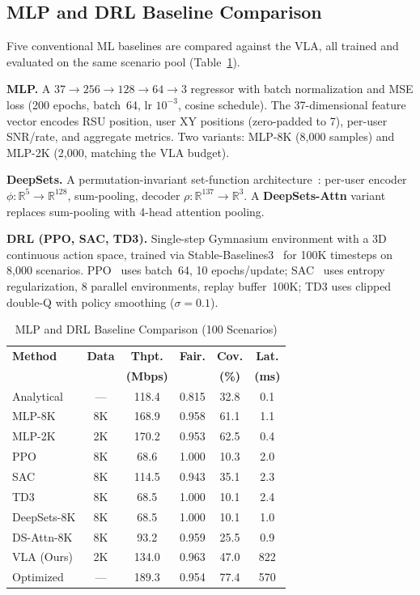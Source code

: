 \documentclass[journal]{IEEEtran}
\begin{document}
\subsection{MLP and DRL Baseline Comparison}
\label{sec:mlp_drl}

Five conventional ML baselines are compared against the VLA, all trained and evaluated on the same scenario pool (Table~\ref{tab:mlp_drl}).

\textbf{MLP.} A $37 \to 256 \to 128 \to 64 \to 3$ regressor with batch normalization and MSE loss (200 epochs, batch~64, lr $10^{-3}$, cosine schedule). The 37-dimensional feature vector encodes RSU position, user XY positions (zero-padded to 7), per-user SNR/rate, and aggregate metrics. Two variants: MLP-8K (8{,}000 samples) and MLP-2K (2{,}000, matching the VLA budget).

\textbf{DeepSets.} A permutation-invariant set-function architecture~\cite{zaheer2017deepsets}: per-user encoder $\phi: \mathbb{R}^5 \to \mathbb{R}^{128}$, sum-pooling, decoder $\rho: \mathbb{R}^{137} \to \mathbb{R}^3$. A \textbf{DeepSets-Attn} variant replaces sum-pooling with 4-head attention pooling.

\textbf{DRL (PPO, SAC, TD3).} Single-step Gymnasium environment with a 3D continuous action space, trained via Stable-Baselines3~\cite{raffin2021sb3} for 100K timesteps on 8{,}000 scenarios. PPO~\cite{schulman2017ppo} uses batch~64, 10 epochs/update; SAC~\cite{haarnoja2018sac} uses entropy regularization, 8 parallel environments, replay buffer~100K; TD3 uses clipped double-Q with policy smoothing ($\sigma{=}0.1$).

\begin{table}[!t]
    \centering
    \caption{MLP and DRL Baseline Comparison (100 Scenarios)}
    \label{tab:mlp_drl}
    \small
    \begin{tabular}{l@{\hskip 5pt}c@{\hskip 5pt}c@{\hskip 5pt}c@{\hskip 5pt}c@{\hskip 5pt}c}
        \toprule
        \textbf{Method} & \textbf{Data} & \textbf{Thpt.} & \textbf{Fair.} & \textbf{Cov.} & \textbf{Lat.} \\
        & & \textbf{(Mbps)} & & \textbf{(\%)} & \textbf{(ms)} \\
        \midrule
        Analytical & --- & 118.4 & 0.815 & 32.8 & 0.1 \\
        MLP-8K & 8K & 168.9 & 0.958 & 61.1 & 1.1 \\
        MLP-2K & 2K & 170.2 & 0.953 & 62.5 & 0.4 \\
        PPO & 8K & 68.6 & 1.000 & 10.3 & 2.0 \\
        SAC & 8K & 114.5 & 0.943 & 35.1 & 2.3 \\
        TD3 & 8K & 68.5 & 1.000 & 10.1 & 2.4 \\
        DeepSets-8K & 8K & 68.5 & 1.000 & 10.1 & 1.0 \\
        DS-Attn-8K & 8K & 93.2 & 0.959 & 25.5 & 0.9 \\
        VLA (Ours) & 2K & 134.0 & 0.963 & 47.0 & 822 \\
        Optimized & --- & 189.3 & 0.954 & 77.4 & 570 \\
        \bottomrule
    \end{tabular}
\end{table}
\end{document}
